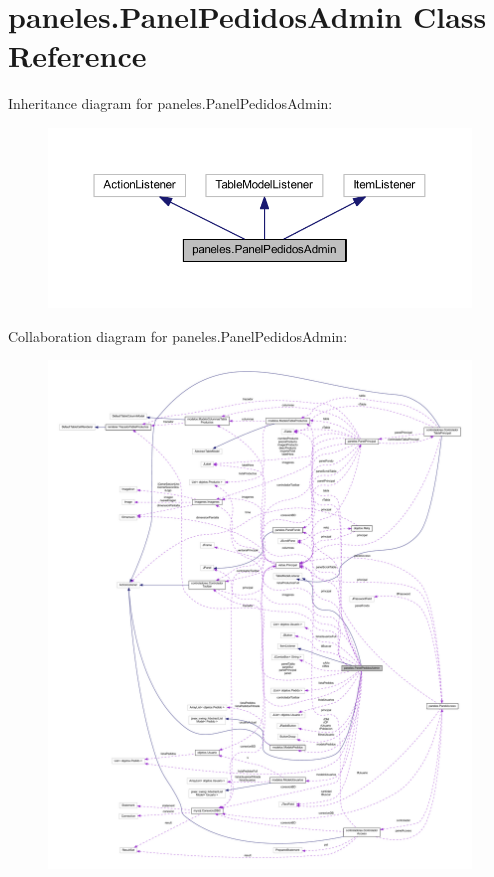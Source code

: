 \hypertarget{classpaneles_1_1_panel_pedidos_admin}{}\section{paneles.\+Panel\+Pedidos\+Admin Class Reference}
\label{classpaneles_1_1_panel_pedidos_admin}


Inheritance diagram for paneles.\+Panel\+Pedidos\+Admin\+:\nopagebreak
\begin{figure}[H]
\begin{center}
\leavevmode
\includegraphics[width=350pt]{classpaneles_1_1_panel_pedidos_admin__inherit__graph}
\end{center}
\end{figure}


Collaboration diagram for paneles.\+Panel\+Pedidos\+Admin\+:\nopagebreak
\begin{figure}[H]
\begin{center}
\leavevmode
\includegraphics[width=350pt]{classpaneles_1_1_panel_pedidos_admin__coll__graph}
\end{center}
\end{figure}
